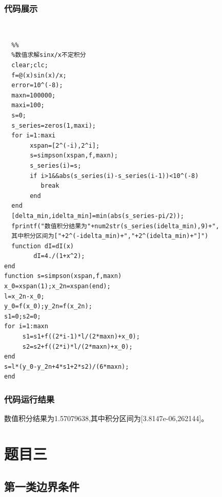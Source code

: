 \documentclass[UTF8,a4paper,10pt]{ctexart}
\begin{document}
\subsubsection{代码展示}
~\\
\lstset{language=matlab}
\begin{lstlisting}
  %%
  %数值求解sinx/x不定积分
  clear;clc;
  f=@(x)sin(x)/x;
  error=10^(-8);
  maxn=100000;
  maxi=100;
  s=0;
  s_series=zeros(1,maxi);
  for i=1:maxi
       xspan=[2^(-i),2^i];
       s=simpson(xspan,f,maxn);
       s_series(i)=s;
       if i>1&&abs(s_series(i)-s_series(i-1))<10^(-8)
          break
       end
  end
  [delta_min,idelta_min]=min(abs(s_series-pi/2));
  fprintf("数值积分结果为"+num2str(s_series(idelta_min),9)+",
  其中积分区间为["+2^(-idelta_min)+","+2^(idelta_min)+"]")
  function dI=dI(x)
        dI=4./(1+x^2);
end
function s=simpson(xspan,f,maxn)
x_0=xspan(1);x_2n=xspan(end);
l=x_2n-x_0;
y_0=f(x_0);y_2n=f(x_2n);
s1=0;s2=0;
for i=1:maxn
     s1=s1+f((2*i-1)*l/(2*maxn)+x_0);
     s2=s2+f((2*i)*l/(2*maxn)+x_0);
end
s=l*(y_0-y_2n+4*s1+2*s2)/(6*maxn);
end
\end{lstlisting}


\subsubsection{代码运行结果}
数值积分结果为1.57079638,其中积分区间为[3.8147e-06,262144]。\newline

\section{题目三}
\subsection{第一类边界条件}
\end{document}
